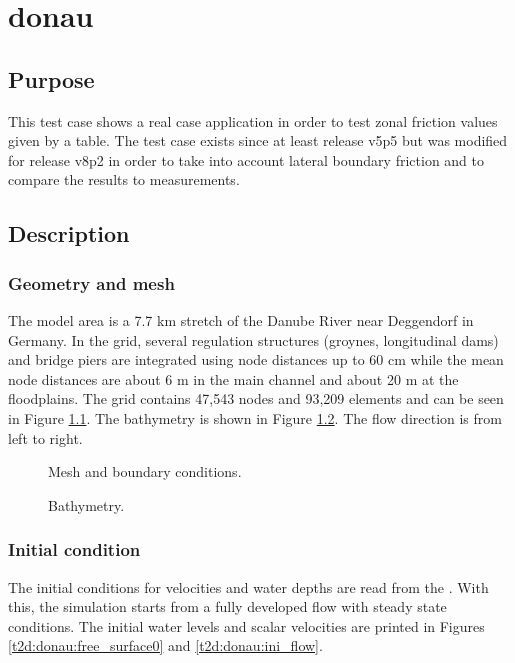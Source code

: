 \chapter{donau}

\section{Purpose}
This test case shows a real case application in order to test zonal friction
values given by a table.
The test case exists since at least release v5p5 but was modified for release
v8p2 in order to take into account lateral boundary friction and to compare the
results to measurements.

\section{Description}

\subsection{Geometry and mesh}
The model area is a 7.7 km stretch of the Danube River near Deggendorf in Germany.
In the grid, several regulation structures (groynes, longitudinal dams) and
bridge piers are integrated using node distances up to 60 cm while the mean
node distances are about 6 m in the main channel and about 20 m at the floodplains.
The grid contains 47,543 nodes and 93,209 elements and can be seen in Figure
\ref{t2d:donau:mesh}.
The bathymetry is shown in Figure \ref{t2d:donau:Bathy}.
The flow direction is from left to right.

\begin{figure}[h!]
\centering
{}
\caption{Mesh and boundary conditions.}
\label{t2d:donau:mesh}
\end{figure}


\begin{figure} [h!]
\centering
{}
\caption{Bathymetry.}
\label{t2d:donau:Bathy}
\end{figure}


\subsection{Initial condition}

The initial conditions for velocities and water depths are read from the
.
With this, the simulation starts from a fully developed flow with steady state
conditions.
The initial water levels and scalar velocities are printed in Figures
\ref{t2d:donau:free_surface0} and \ref{t2d:donau:ini_flow}.

